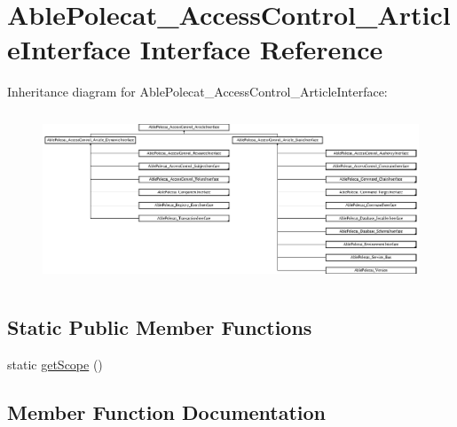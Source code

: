 \hypertarget{interface_able_polecat___access_control___article_interface}{}\section{Able\+Polecat\+\_\+\+Access\+Control\+\_\+\+Article\+Interface Interface Reference}
\label{interface_able_polecat___access_control___article_interface}
Inheritance diagram for Able\+Polecat\+\_\+\+Access\+Control\+\_\+\+Article\+Interface\+:\begin{figure}[H]
\begin{center}
\leavevmode
\includegraphics[height=5.121951cm]{interface_able_polecat___access_control___article_interface}
\end{center}
\end{figure}
\subsection*{Static Public Member Functions}
\begin{DoxyCompactItemize}
\item 
static \hyperlink{interface_able_polecat___access_control___article_interface_ad9ade868bd136d32967059d1cccb3e92}{get\+Scope} ()
\end{DoxyCompactItemize}


\subsection{Member Function Documentation}
\hypertarget{interface_able_polecat___access_control___article_interface_ad9ade868bd136d32967059d1cccb3e92}{}
